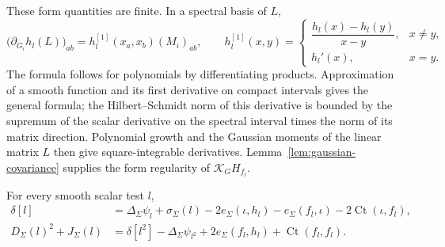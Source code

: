 These form quantities are finite. In a spectral basis of \(L\),
\[
 \bigl(\partial_{G_i}h_l(L)\bigr)_{ab}
   =h_l^{[1]}(x_a,x_b)(M_i)_{ab},\qquad
 h_l^{[1]}(x,y)=
 \begin{cases}
  \dfrac{h_l(x)-h_l(y)}{x-y},&x\ne y,\\
  h_l'(x),&x=y.
 \end{cases}
\]
The formula follows for polynomials by differentiating products.
Approximation of a smooth function and its first derivative on compact
intervals gives the general formula; the Hilbert--Schmidt norm of
this derivative is bounded by the supremum of the scalar derivative
on the spectral interval times the norm of its matrix direction.
Polynomial growth and the Gaussian moments of the linear matrix
\(L\) then give square-integrable derivatives.
Lemma~\ref{lem:gaussian-covariance} supplies the form regularity of
\(\mathcal K_GH_{f_l}\).

\begin{lemma}\label{lem:profile-quadratics}
 For every smooth scalar test \(l\),
 \begin{equation}\tag{17}\label{eq:17}
 \begin{aligned}
  \delta[l]
   &=\Delta_\Sigma\psi_l+\sigma_\Sigma(l)
      -2e_\Sigma(\iota,h_l)-e_\Sigma(f_l,\iota)
      -2\operatorname{Ct}(\iota,f_l),\\
  D_\Sigma(l)^2+J_\Sigma(l)
   &=\delta[l^2]-\Delta_\Sigma\psi_{l^2}
      +2e_\Sigma(f_l,h_l)+\operatorname{Ct}(f_l,f_l).
 \end{aligned}
 \end{equation}
\end{lemma}

